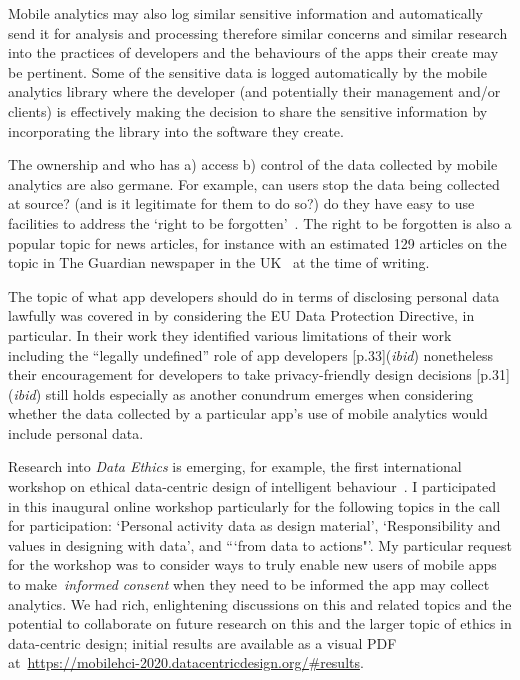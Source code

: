 Mobile analytics may also log similar sensitive information and automatically send it for analysis and processing therefore similar concerns and similar research into the practices of developers and the behaviours of the apps their create may be pertinent. Some of the sensitive data is logged automatically by the mobile analytics library where the developer (and potentially their management and/or clients) is effectively making the decision to share the sensitive information by incorporating the library into the software they create.

The ownership and who has a) access b) control of the data collected by mobile analytics are also germane. For example, can users stop the data being collected at source? (and is it legitimate for them to do so?) do they have easy to use facilities to address the `right to be forgotten'~. The right to be forgotten is also a popular topic for news articles, for instance with an estimated 129 articles on the topic in The Guardian newspaper in the UK~ at the time of writing. 

The topic of what app developers should do in terms of disclosing personal data lawfully was covered in  by considering the EU Data Protection Directive, in particular. In their work they identified various limitations of their work including the ``legally undefined'' role of app developers [p.33](\emph{ibid}) nonetheless their encouragement for developers to take privacy-friendly design decisions [p.31](\emph{ibid}) still holds especially as another conundrum emerges when considering whether the data collected by a particular app's use of mobile analytics would include personal data. 

Research into \emph{Data Ethics} is emerging, for example, the first international workshop on ethical data-centric design of intelligent behaviour~. I participated in this inaugural online workshop particularly for the following topics in the call for participation: `Personal activity data as design material', `Responsibility and values in designing with data', and ```from data to actions"'. My particular request for the workshop was to consider ways to truly enable new users of mobile apps to make~\emph{informed consent} when they need to be informed the app may collect analytics. We had rich, enlightening discussions on this and related topics and the potential to collaborate on future research on this and the larger topic of ethics in data-centric design; initial results are available as a visual PDF at~\url{https://mobilehci-2020.datacentricdesign.org/#results}.

